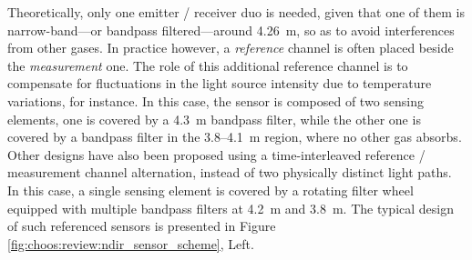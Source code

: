 Theoretically, only one emitter / receiver duo is needed, given that one of them is narrow-band---or bandpass filtered---around 4.26~\textmu{}m, so as to avoid interferences from other gases. In practice however, a \emph{reference} channel is often placed beside the \emph{measurement} one\cite{popa2019, zhang2010, jing2020}. The role of this additional reference channel is to compensate for fluctuations in the light source intensity due to temperature variations, for instance. In this case, the sensor is composed of two sensing elements, one is covered by a 4.3~\textmu{}m bandpass filter, while the other one is covered by a bandpass filter in the 3.8--4.1~\textmu{}m region, where no other gas absorbs. Other designs have also been proposed using a time-interleaved reference / measurement channel alternation, instead of two physically distinct light paths. In this case, a single sensing element is covered by a rotating filter wheel equipped with multiple bandpass filters at 4.2~\textmu{}m and 3.8~\textmu{}m\cite{kohsiek1991}. The typical design of such referenced sensors is presented in Figure \ref{fig:choos:review:ndir_sensor_scheme}, Left.

